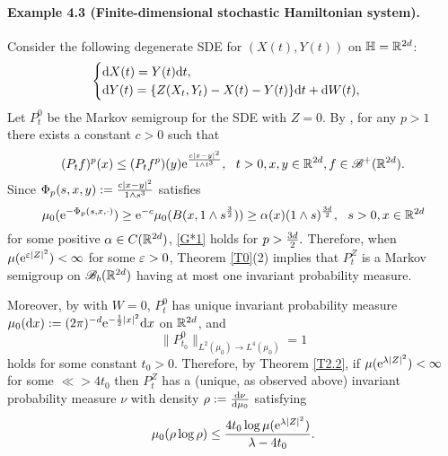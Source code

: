 \documentclass[12pt,leqno]{article}
\theoremstyle{definition}
\numberwithin{equation}{section} \theoremstyle{remark}
\begin{document}
\paragraph{Example 4.3 (Finite-dimensional stochastic Hamiltonian system).} Consider the following degenerate SDE for $(X(t),Y(t))$ on $\H= \R^{2d}$:
$$ \beg{cases}\d X(t)=  Y(t) \d t,\\
\d Y(t)= \{Z(X_t,Y_t)- X(t)- Y(t)\}\d t +   \d W(t),\end{cases}$$ Let $P_t^0$ be the Markov semigroup for the SDE with $Z=0$.  By  \cite[Theorem 4.4]{GW},    for any $p>1$ there exists a constant $c>0$ such that
$$(P_tf)^p(x)\le (P_tf^p)(y) \e^{\ff{c|x-y|^2}{1\land t^3}},\ \ t>0, x,y\in \R^{2d}, f\in \B^+(\R^{2d}).$$   Since $\Phi_p(s,x,y):= \ff{c|x-y|^2}{1\land s^3}$ satisfies
$$\mu_0(\e^{-\Phi_p(s,x,\cdot)})\ge \e^{-c} \mu_0(B(x, 1\land s^{\ff 3 2}))\ge \aa(x) (1\land s)^{\ff{3 d}2},\ \ s>0, x\in \R^{2d} $$ for some positive $\aa\in C(\R^{2d})$, \eqref{G*1} holds for $p>\ff{3 d} 2.$ Therefore, when $\mu(\e^{\vv|Z|^2})<\infty$ for some $\vv>0$,   Theorem \ref{T0}(2) implies that $P_t^Z$ is a Markov semigroup on $\B_b(\R^{2d})$ having at most one invariant probability measure.

Moreover,   by \cite[Example 5.1]{W15b}   with $W=0$,    $P_t^0$ has  unique invariant probability measure $\mu_0(\d x):= (2\pi)^{-d } \e^{-\ff 1 2 |x|^2}\d x$ on $\R^{2d} $, and
 $$\|P_{t_0}^0\|_{L^2(\mu_0)\to L^4(\mu_0)}=1$$ holds for some constant $t_0>0$. Therefore, by Theorem \ref{T2.2}, if $\mu(\e^{\ll|Z|^2})<\infty$ for some $\ll> 4 t_0$ then $P_t^Z$ has a (unique, as observed above) invariant probability measure $\nu$ with density $\rr:=\ff{\d\nu}{\d\mu_0}$ satisfying
 $$\mu_0(\rr\log \rr) \le \ff{4 t_0 \log\mu(\e^{\ll |Z|^2})}{\ll - 4 t_0}. $$
\end{document}
